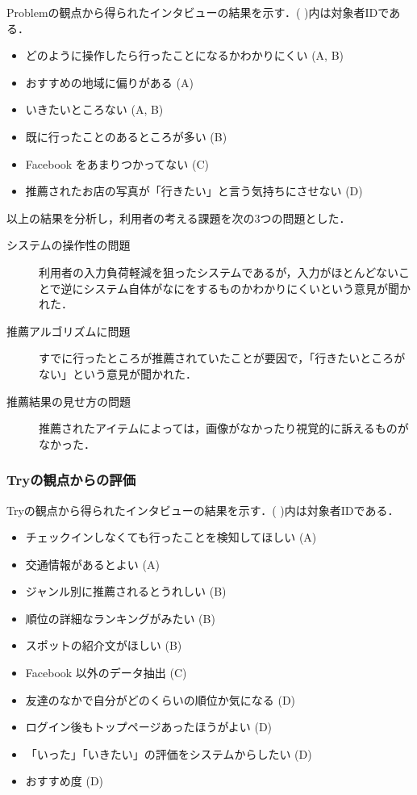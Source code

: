 \documentclass{jsarticle}
\begin{document}
Problemの観点から得られたインタビューの結果を示す．( )内は対象者IDである．

\begin{itemize}
\item どのように操作したら行ったことになるかわかりにくい (A, B)
\item おすすめの地域に偏りがある (A)
\item いきたいところない (A, B)
\item 既に行ったことのあるところが多い (B)
\item Facebook をあまりつかってない (C)
\item 推薦されたお店の写真が「行きたい」と言う気持ちにさせない (D)
\end{itemize}

以上の結果を分析し，利用者の考える課題を次の3つの問題とした．

\begin{description}
\item[システムの操作性の問題] 利用者の入力負荷軽減を狙ったシステムであるが，入力がほとんどないことで逆にシステム自体がなにをするものかわかりにくいという意見が聞かれた．
\item[推薦アルゴリズムに問題] すでに行ったところが推薦されていたことが要因で，「行きたいところがない」という意見が聞かれた．
\item[推薦結果の見せ方の問題] 推薦されたアイテムによっては，画像がなかったり視覚的に訴えるものがなかった．
\end{description}

\subsubsection{Tryの観点からの評価}

Tryの観点から得られたインタビューの結果を示す．( )内は対象者IDである．

\begin{itemize}
\item チェックインしなくても行ったことを検知してほしい (A)
\item 交通情報があるとよい (A)
\item ジャンル別に推薦されるとうれしい (B)
\item 順位の詳細なランキングがみたい (B)
\item スポットの紹介文がほしい (B)
\item Facebook 以外のデータ抽出 (C)
\item 友達のなかで自分がどのくらいの順位か気になる (D)
\item ログイン後もトップページあったほうがよい (D)
\item 「いった」「いきたい」の評価をシステムからしたい (D)
\item おすすめ度 (D)
\end{itemize}
\end{document}
